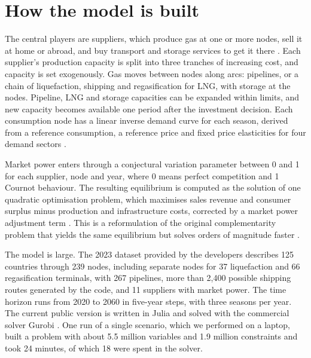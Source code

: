 \section{How the model is built}

The central players are suppliers, which produce gas at one or more nodes, sell it at home or abroad, and buy transport and storage services to get it there \citep[p.~48]{egging2019global}.
Each supplier's production capacity is split into three tranches of increasing cost, and capacity is set exogenously.
Gas moves between nodes along arcs: pipelines, or a chain of liquefaction, shipping and regasification for LNG, with storage at the nodes.
Pipeline, LNG and storage capacities can be expanded within limits, and new capacity becomes available one period after the investment decision.
Each consumption node has a linear inverse demand curve for each season, derived from a reference consumption, a reference price and fixed price elasticities for four demand sectors \citep[pp.~32--33]{egging2019global}.

Market power enters through a conjectural variation parameter between 0 and 1 for each supplier, node and year, where 0 means perfect competition and 1 Cournot behaviour.
The resulting equilibrium is computed as the solution of one quadratic optimisation problem, which maximises sales revenue and consumer surplus minus production and infrastructure costs, corrected by a market power adjustment term \citep[pp.~47--49]{egging2019global}.
This is a reformulation of the original complementarity problem that yields the same equilibrium but solves orders of magnitude faster \citep{egging2020solving}.

The model is large.
The 2023 dataset provided by the developers describes 125 countries through 239 nodes, including separate nodes for 37 liquefaction and 66 regasification terminals, with 267 pipelines, more than 2,400 possible shipping routes generated by the code, and 11 suppliers with market power.
The time horizon runs from 2020 to 2060 in five-year steps, with three seasons per year.
The current public version is written in Julia and solved with the commercial solver Gurobi \citep{ggmpublicongithubndggm}.
One run of a single scenario, which we performed on a laptop, built a problem with about 5.5 million variables and 1.9 million constraints and took 24 minutes, of which 18 were spent in the solver.
